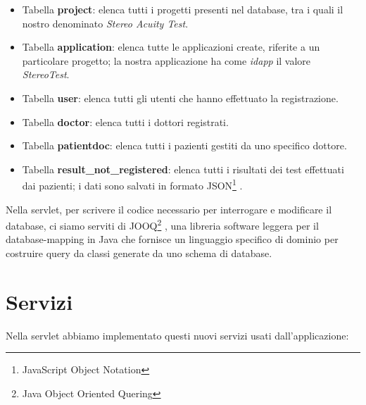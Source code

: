 \documentclass[
	corpo=12pt,
	twoside,
 	evenboxes,
	tipotesi=triennale,
    	stile=classica,
   	 greek,
]{toptesi}
\begin{document}
\begin{itemize}
\item Tabella \textbf{project}: elenca tutti i progetti presenti nel database, tra i quali il nostro denominato \textit{Stereo Acuity Test}.
\item Tabella \textbf{application}: elenca tutte le applicazioni create, riferite a un particolare progetto; la nostra applicazione ha come \textit{idapp} il valore \textit{StereoTest}.
\item Tabella \textbf{user}: elenca tutti gli utenti che hanno effettuato la registrazione.
\item Tabella \textbf{doctor}: elenca tutti i dottori registrati.
\item Tabella \textbf{patientdoc}: elenca tutti i pazienti gestiti da uno specifico dottore.
\item Tabella \textbf{result\_not\_registered}: elenca tutti i risultati dei test effettuati dai pazienti; i dati sono salvati in formato JSON\footnote{JavaScript Object Notation} \cite{json}.
\end{itemize}

\newpage

Nella servlet, per scrivere il codice necessario per interrogare e modificare il database, ci siamo serviti di JOOQ\footnote{Java Object Oriented Quering} \cite{jooq}, una libreria software leggera per il database-mapping in Java che fornisce un linguaggio specifico di dominio per costruire query da classi generate da uno schema di database.

\section{Servizi}
\label{sec:servizi}
Nella servlet abbiamo implementato questi nuovi servizi usati dall'applicazione:
\end{document}
